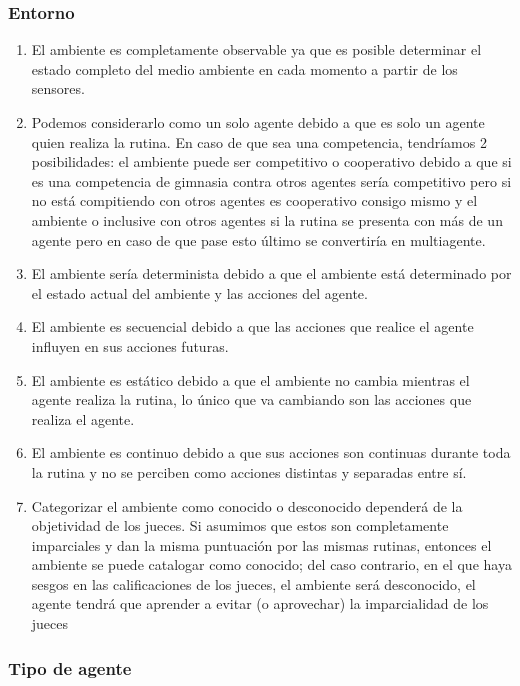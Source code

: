 \documentclass{article}
\begin{document}
            \subsubsection{Entorno}
                \begin{enumerate}
                    \item El ambiente es completamente observable ya que es posible determinar el estado completo del medio ambiente en cada momento a partir de los sensores.
                    \item Podemos considerarlo como un solo agente debido a que es solo un agente quien realiza la rutina. En caso de que sea una competencia, tendríamos 2 posibilidades: el ambiente puede ser competitivo o cooperativo debido a que si es una competencia de gimnasia contra otros agentes sería competitivo pero si no está compitiendo con otros agentes es cooperativo consigo mismo y el ambiente o inclusive con otros agentes si la rutina se presenta con más de un agente pero en caso de que pase esto último se convertiría en multiagente.
                    \item El ambiente sería determinista debido a que el ambiente está determinado por el estado actual del ambiente y las acciones del agente.
                    \item El ambiente es secuencial debido a que las acciones que realice el agente influyen en sus acciones futuras.
                    \item El ambiente es estático debido a que el ambiente no cambia mientras el agente realiza la rutina, lo único que va cambiando son las acciones que realiza el agente.
                    \item El ambiente es continuo debido a que sus acciones son continuas durante toda la rutina y no se perciben como acciones distintas y separadas entre sí.
                    \item Categorizar el ambiente como conocido o desconocido dependerá de la objetividad de los jueces. Si asumimos que estos son completamente imparciales y dan la misma puntuación por las mismas rutinas, entonces el ambiente se puede catalogar como conocido; del caso contrario, en el que haya sesgos en las calificaciones de los jueces, el ambiente será desconocido, el agente tendrá que aprender a evitar (o aprovechar) la imparcialidad de los jueces
                \end{enumerate}

            \subsubsection{Tipo de agente}
                
\end{document}

